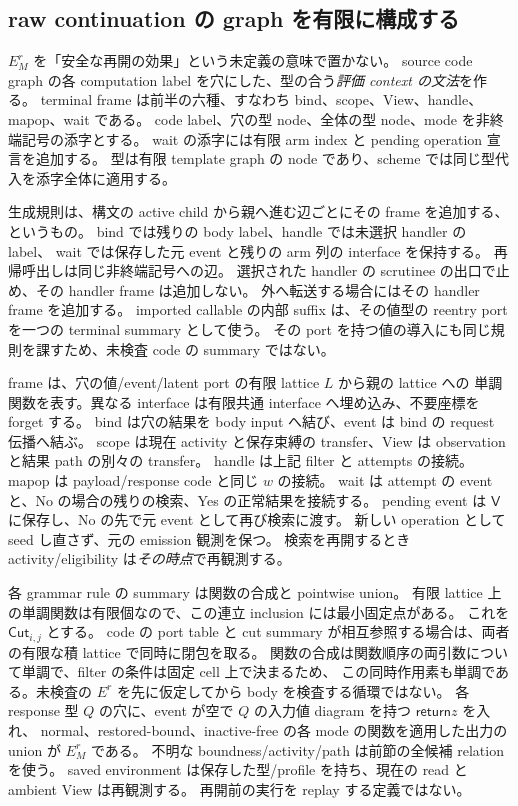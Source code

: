 \documentclass[11pt,a4paper]{article}
\newcommand{\Ret}{\mathsf{return}}
\begin{document}
\subsection{raw continuation の graph を有限に構成する}
\label{sec:cuts}

\(E_M^r\) を「安全な再開の効果」という未定義の意味で置かない。
source code graph の各 computation label を穴にした、型の合う\emph{評価 context の文法}を作る。
terminal frame は前半の六種、すなわち bind、scope、View、handle、mapop、wait である。
code label、穴の型 node、全体の型 node、mode を非終端記号の添字とする。
wait の添字には有限 arm index と pending operation 宣言を追加する。
型は有限 template graph の node であり、scheme では同じ型代入を添字全体に適用する。

生成規則は、構文の active child から親へ進む辺ごとにその frame を追加する、というもの。
bind では残りの body label、handle では未選択 handler の label、
wait では保存した元 event と残りの arm 列の interface を保持する。
再帰呼出しは同じ非終端記号への辺。
選択された handler の scrutinee の出口で止め、その handler frame は追加しない。
外へ転送する場合にはその handler frame を追加する。
imported callable の内部 suffix は、その値型の reentry port を一つの terminal summary として使う。
その port を持つ値の導入にも同じ規則を課すため、未検査 code の summary ではない。

frame は、穴の値/event/latent port の有限 lattice \(L\) から親の lattice への
単調関数を表す。異なる interface は有限共通 interface へ埋め込み、不要座標を forget する。
bind は穴の結果を body input へ結び、event は bind の request 伝播へ結ぶ。
scope は現在 activity と保存束縛の transfer、View は observation と結果 path の別々の transfer。
handle は上記 filter と attempts の接続。
mapop は payload/response code と同じ \(w\) の接続。
wait は attempt の event と、No の場合の残りの検索、Yes の正常結果を接続する。
pending event は \(\mathsf V\) に保存し、No の先で元 event として再び検索に渡す。
新しい operation として seed し直さず、元の emission 観測を保つ。
検索を再開するとき activity/eligibility は\emph{その時点}で再観測する。

各 grammar rule の summary は関数の合成と pointwise union。
有限 lattice 上の単調関数は有限個なので、この連立 inclusion には最小固定点がある。
これを \(\mathsf{Cut}_{i,j}\) とする。
code の port table と cut summary が相互参照する場合は、両者の有限な積 lattice で同時に閉包を取る。
関数の合成は関数順序の両引数について単調で、filter の条件は固定 cell 上で決まるため、
この同時作用素も単調である。未検査の \(E^r\) を先に仮定してから body を検査する循環ではない。
各 response 型 \(Q\) の穴に、event が空で \(Q\) の入力値 diagram を持つ \(\Ret z\) を入れ、
normal、restored-bound、inactive-free の各 mode の関数を適用した出力の union が \(E_M^r\) である。
不明な boundness/activity/path は前節の全候補 relation を使う。
saved environment は保存した型/profile を持ち、現在の read と ambient View は再観測する。
再開前の実行を replay する定義ではない。
\end{document}

